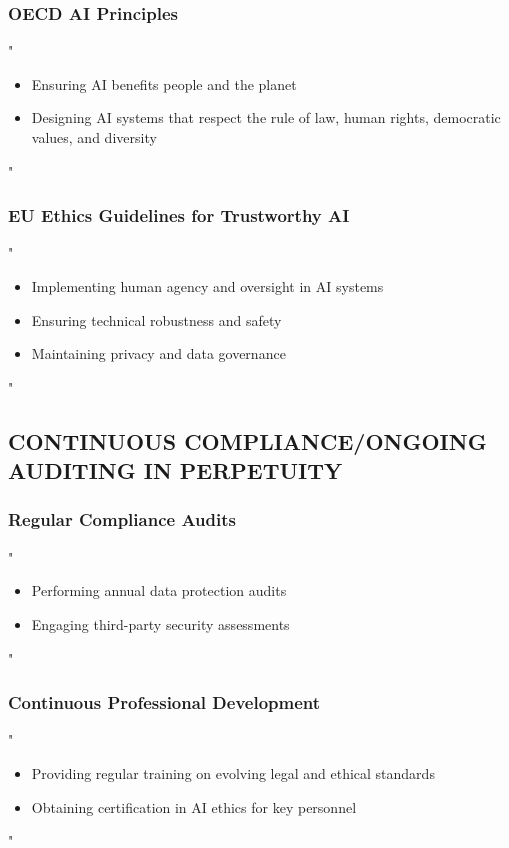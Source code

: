 \documentclass[14pt,a4paper]{article}
\begin{document}
\textit{\parencite{UNESCO2022}}

\subsubsection*{OECD AI Principles}
"
\begin{itemize}
    \item Ensuring AI benefits people and the planet
    \item Designing AI systems that respect the rule of law, human rights, democratic values, and diversity
\end{itemize}
"

\textit{\parencite{OECD2024}}

\subsubsection*{EU Ethics Guidelines for Trustworthy AI}
"
\begin{itemize}
    \item Implementing human agency and oversight in AI systems
    \item Ensuring technical robustness and safety
    \item Maintaining privacy and data governance
\end{itemize}
"

\textit{\parencite{EC2024}}

\subsection*{CONTINUOUS COMPLIANCE/ONGOING AUDITING IN PERPETUITY}

\subsubsection*{Regular Compliance Audits}
"
\begin{itemize}
    \item Performing annual data protection audits
    \item Engaging third-party security assessments
\end{itemize}
"

\textit{\parencite{ICO2021}}

\subsubsection*{Continuous Professional Development}
"
\begin{itemize}
    \item Providing regular training on evolving legal and ethical standards
    \item Obtaining certification in AI ethics for key personnel
\end{itemize}
"

\textit{\parencite{IEEE2024}}


\newpage

\printbibliography
\end{document}
